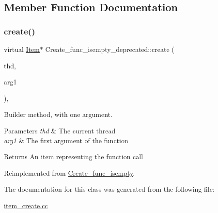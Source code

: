 \subsection{Member Function Documentation}
\mbox{\label{classCreate__func__isempty__deprecated_ac25a3427cf94499607940b1077c37b29}} 
\subsubsection{\texorpdfstring{create()}{create()}}
{\footnotesize\ttfamily virtual \mbox{\hyperlink{classItem}{Item}}$\ast$ Create\+\_\+func\+\_\+isempty\+\_\+deprecated\+::create (\begin{DoxyParamCaption}\item[{T\+HD $\ast$}]{thd,  }\item[{\mbox{\hyperlink{classItem}{Item}} $\ast$}]{arg1 }\end{DoxyParamCaption})\hspace{0.3cm}{\ttfamily [inline]}, {\ttfamily [virtual]}}

Builder method, with one argument. 
\begin{DoxyParams}{Parameters}
{\em thd} & The current thread \\
\hline
{\em arg1} & The first argument of the function \\
\hline
\end{DoxyParams}
\begin{DoxyReturn}{Returns}
An item representing the function call 
\end{DoxyReturn}


Reimplemented from \mbox{\hyperlink{classCreate__func__isempty_aab176e782cca041c5b6e5c24485859e3}{Create\+\_\+func\+\_\+isempty}}.



The documentation for this class was generated from the following file\+:\begin{DoxyCompactItemize}
\item 
\mbox{\hyperlink{item__create_8cc}{item\+\_\+create.\+cc}}\end{DoxyCompactItemize}
